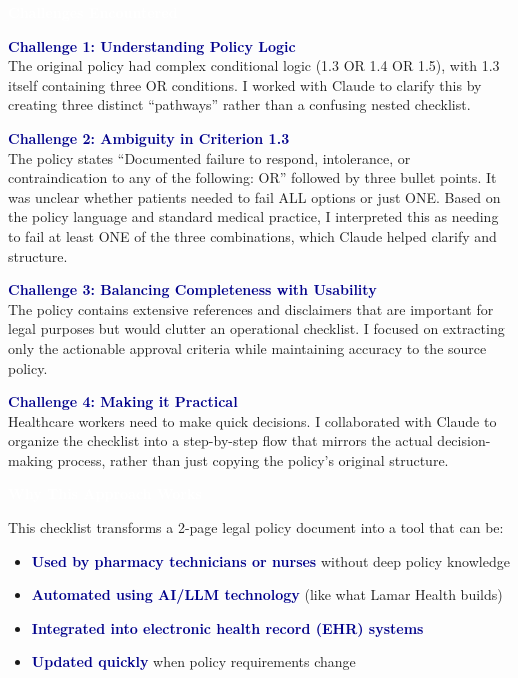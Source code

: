 \documentclass[11pt,letterpaper]{article}
\newcommand{\sectionheader}[1]{
    \vspace{0.4cm}
    \noindent
    \colorbox{primaryblue}{
        \parbox{\dimexpr\textwidth-2\fboxsep}{
            \textcolor{white}{\Large\bfseries\sffamily #1}
        }
    }
    \vspace{0.3cm}
}
\begin{document}
\vspace{0.5cm}

\sectionheader{Challenges Encountered}

\textcolor{darkblue}{\bfseries\large Challenge 1: Understanding Policy Logic}\\[0.1cm]
The original policy had complex conditional logic (1.3 OR 1.4 OR 1.5), with 1.3 itself containing three OR conditions. I worked with Claude to clarify this by creating three distinct ``pathways'' rather than a confusing nested checklist.

\vspace{0.25cm}

\textcolor{darkblue}{\bfseries\large Challenge 2: Ambiguity in Criterion 1.3}\\[0.1cm]
The policy states ``Documented failure to respond, intolerance, or contraindication to any of the following: OR'' followed by three bullet points. It was unclear whether patients needed to fail ALL options or just ONE. Based on the policy language and standard medical practice, I interpreted this as needing to fail at least ONE of the three combinations, which Claude helped clarify and structure.

\vspace{0.25cm}

\textcolor{darkblue}{\bfseries\large Challenge 3: Balancing Completeness with Usability}\\[0.1cm]
The policy contains extensive references and disclaimers that are important for legal purposes but would clutter an operational checklist. I focused on extracting only the actionable approval criteria while maintaining accuracy to the source policy.

\vspace{0.25cm}

\textcolor{darkblue}{\bfseries\large Challenge 4: Making it Practical}\\[0.1cm]
Healthcare workers need to make quick decisions. I collaborated with Claude to organize the checklist into a step-by-step flow that mirrors the actual decision-making process, rather than just copying the policy's original structure.

\vspace{0.4cm}

\sectionheader{Why This Approach Works}

This checklist transforms a 2-page legal policy document into a tool that can be:

\begin{itemize}
    \item \textcolor{darkblue}{\bfseries Used by pharmacy technicians or nurses} without deep policy knowledge
    \item \textcolor{darkblue}{\bfseries Automated using AI/LLM technology} (like what Lamar Health builds)
    \item \textcolor{darkblue}{\bfseries Integrated into electronic health record (EHR) systems}
    \item \textcolor{darkblue}{\bfseries Updated quickly} when policy requirements change
\end{itemize}
\end{document}
